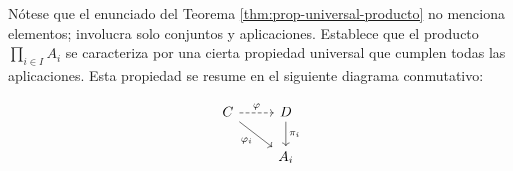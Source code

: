 
Nótese que el enunciado del Teorema \ref{thm:prop-universal-producto} no menciona elementos; involucra solo conjuntos y aplicaciones. Establece que el producto \( \prod_{i \in I} A_i \) se caracteriza por una cierta propiedad universal que cumplen todas las aplicaciones. Esta propiedad se resume en el siguiente diagrama conmutativo:

\[
    \begin{tikzcd}
    C \arrow[swap]{dr}{\varphi_i} \arrow[dashed]{r}{\varphi} & D \arrow{d}{\pi_i} \\
    & A_i
    \end{tikzcd}
\]